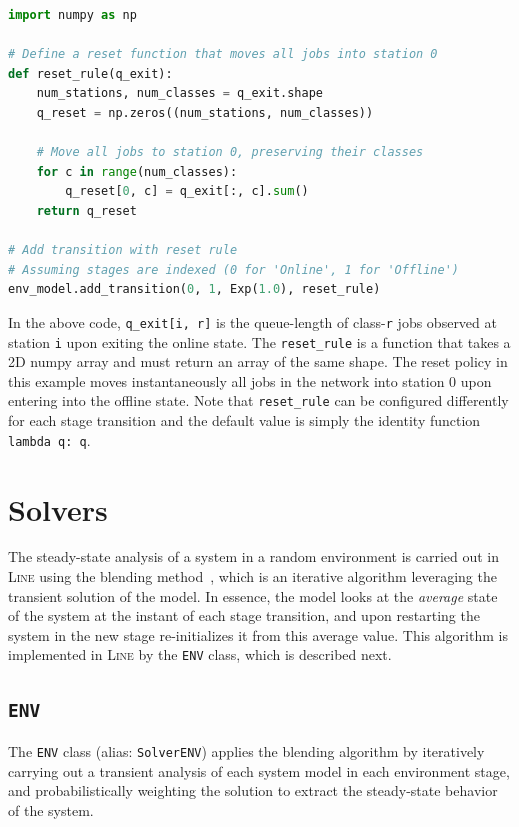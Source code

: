 \begin{PYTHON}
\begin{lstlisting}[language = python]
import numpy as np

# Define a reset function that moves all jobs into station 0
def reset_rule(q_exit):
    num_stations, num_classes = q_exit.shape
    q_reset = np.zeros((num_stations, num_classes))

    # Move all jobs to station 0, preserving their classes
    for c in range(num_classes):
        q_reset[0, c] = q_exit[:, c].sum()
    return q_reset

# Add transition with reset rule
# Assuming stages are indexed (0 for 'Online', 1 for 'Offline')
env_model.add_transition(0, 1, Exp(1.0), reset_rule)
\end{lstlisting}
In the above code, \texttt{q\_exit[i, r]} is the queue-length of class-\texttt{r} jobs observed at station \texttt{i} upon exiting the online state. The \texttt{reset\_rule} is a function that takes a 2D numpy array and must return an array of the same shape. The reset policy in this example moves instantaneously all jobs in the network into station 0 upon entering into the offline state. Note that \texttt{reset\_rule} can be configured differently for each stage transition and the default value is simply the identity function \texttt{lambda q: q}.
\end{PYTHON}

\section{Solvers}
The steady-state analysis of a system in a random environment is carried out in \textsc{Line} using the blending method~\cite{CasTH14}, which is an iterative algorithm leveraging the transient solution of the model. In essence, the model looks at the \emph{average} state of the system at the instant of each stage transition, and upon restarting the system in the new stage re-initializes it from this average value. This algorithm is implemented  in \textsc{Line} by the \texttt{ENV} class, which is described next.

\subsection{\texttt{ENV}}
 The \texttt{ENV} class (alias: \texttt{SolverENV}) applies the blending algorithm by iteratively carrying out a transient analysis of each system model in each environment stage, and probabilistically weighting the solution to extract the steady-state behavior of the system.

